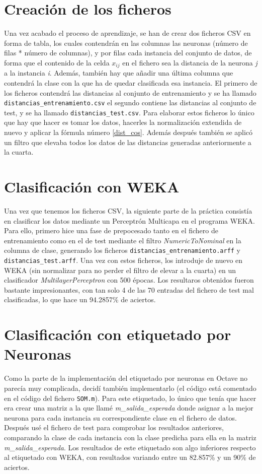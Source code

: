 \documentclass[paper=a4, fontsize=12pt]{scrartcl}
\begin{document}
\section{Creación de los ficheros}
Una vez acabado el proceso de aprendizaje, se han de crear dos ficheros CSV en forma de tabla, los cuales contendrán en las columnas las neuronas (número de filas * número de columnas), y por filas cada instancia del conjunto de datos, de forma que el contenido de la celda ${x_{ij}}$ en el fichero sea la distancia de la neurona \textit{j} a la instancia \textit{i}. Además, también hay que añadir una última columna que contendrá la clase con la que ha de quedar clasificada esa instancia. El primero de los ficheros contendrá las distancias al conjunto de entrenamiento y se ha llamado \texttt{distancias\_entrenamiento.csv} el segundo contiene las distancias al conjunto de test, y se ha llamado \texttt{distancias\_test.csv}. Para elaborar estos ficheros lo único que hay que hacer es tomar los datos, hacerles la normalización extendida de nuevo y aplicar la fórmula número \ref{dist_cos}. Además después también se aplicó un filtro que elevaba todos los datos de las distancias generadas anteriormente a la cuarta.\\


\section{Clasificación con WEKA}
Una vez que tenemos los ficheros CSV, la siguiente parte de la práctica consistía en clasificar los datos mediante un Perceptrón Multicapa en el programa WEKA. Para ello, primero hice una fase de prepocesado tanto en el fichero de entrenamiento como en el de test mediante el filtro \textit{NumericToNominal} en la columna de clase, generando los ficheros \texttt{distancias\_entrenamiento.arff} y \texttt{distancias\_test.arff}. Una vez con estos ficheros, los introduje de nuevo en WEKA (sin normalizar para no perder el filtro de elevar a la cuarta) en un clasificador \textit{MultilayerPerceptron} con 500 épocas. Los resultaros obtenidos fueron bastante impresionantes, con tan solo 4 de las 70 entradas del fichero de test mal clasificadas, lo que hace un 94.2857\% de aciertos.\\


\section{Clasificación con etiquetado por Neuronas}
Como la parte de la implementación del etiquetado por neuronas en Octave no parecía muy complicada, decidí también implementarlo (el código está comentado en el código del fichero \texttt{SOM.m}). Para este etiquetado, lo único que tenía que hacer era crear una matriz a la que llamé \textit{m\_salida\_esperada} donde asignar a la mejor neurona para cada instancia su correspondiente clase en el fichero de datos. Después usé el fichero de test para comprobar los resultados anteriores, comparando la clase de cada instancia con la clase predicha para ella en la matriz \textit{m\_salida\_esperada}. Los resultados de este etiquetado son algo inferiores respecto al etiquetado con WEKA, con resultados variando entre un 82.857\% y un 90\% de aciertos.\\
\end{document}
